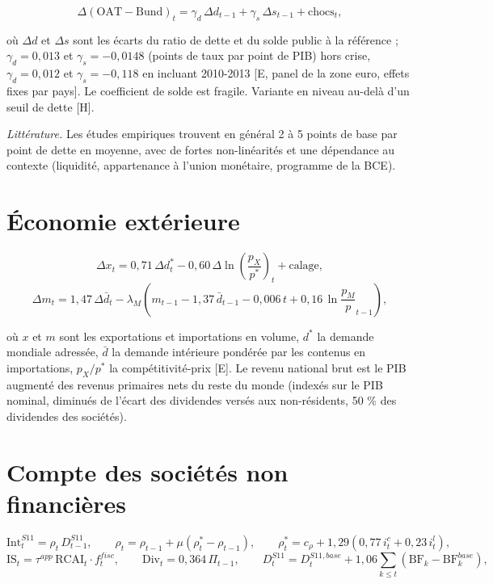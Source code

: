 \documentclass[
  11pt,
  11pt,
  a4paper,
  openany]{book}
\begin{document}
\[\Delta(\text{OAT} - \text{Bund})_t = \gamma_d\,\Delta d_{t-1} + \gamma_s\,\Delta s_{t-1} + \text{chocs}_t,\]

où \(\Delta d\) et \(\Delta s\) sont les écarts du ratio de dette et du
solde public à la référence ; \(\gamma_d = 0{,}013\) et
\(\gamma_s = -0{,}0148\) (points de taux par point de PIB) hors crise,
\(\gamma_d = 0{,}012\) et \(\gamma_s = -0{,}118\) en incluant 2010-2013
{[}E, panel de la zone euro, effets fixes par pays{]}. Le coefficient de
solde est fragile. Variante en niveau au-delà d'un seuil de dette
{[}H{]}.

\emph{Littérature.} Les études empiriques trouvent en général 2 à 5
points de base par point de dette en moyenne, avec de fortes
non-linéarités et une dépendance au contexte (liquidité, appartenance à
l'union monétaire, programme de la BCE).

\hypertarget{sec:eq-exterieur}{%
\section{Économie extérieure}\label{sec:eq-exterieur}}

\[\Delta x_t = 0{,}71\,\Delta d^*_t - 0{,}60\,\Delta\ln\left(\frac{p_X}{p^*}\right)_t + \text{calage},\]
\[\Delta m_t = 1{,}47\,\Delta \bar d_t - \lambda_M\left(m_{t-1} - 1{,}37\,\bar d_{t-1} - 0{,}006\,t + 0{,}16\,\ln\frac{p_M}{p}_{t-1}\right),\]

où \(x\) et \(m\) sont les exportations et importations en volume,
\(d^*\) la demande mondiale adressée, \(\bar d\) la demande intérieure
pondérée par les contenus en importations, \(p_X/p^*\) la
compétitivité-prix {[}E{]}. Le revenu national brut est le PIB augmenté
des revenus primaires nets du reste du monde (indexés sur le PIB
nominal, diminués de l'écart des dividendes versés aux non-résidents, 50
\% des dividendes des sociétés).

\hypertarget{sec:eq-societes}{%
\section{Compte des sociétés non financières}\label{sec:eq-societes}}

\[\text{Int}^{S11}_t = \rho_t\,D^{S11}_{t-1}, \qquad \rho_t = \rho_{t-1} + \mu\left(\rho^*_t - \rho_{t-1}\right), \qquad \rho^*_t = c_\rho + 1{,}29\left(0{,}77\,i^{c}_t + 0{,}23\,i^{l}_t\right),\]
\[\text{IS}_t = \tau^{app}\,\text{RCAI}_t\cdot f^{fisc}_t, \qquad \text{Div}_t = 0{,}364\,\Pi_{t-1}, \qquad
D^{S11}_t = D^{S11,base}_t + 1{,}06\sum_{k \le t}\left(\text{BF}_k - \text{BF}^{base}_k\right),\]
\end{document}

